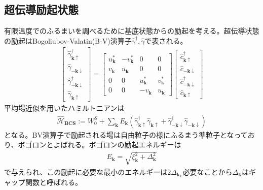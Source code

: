\documentclass[dvipdfmx, 11pt, twocolumn]{jsarticle}
\begin{document}
\subsection{超伝導励起状態}
    有限温度でのふるまいを調べるために基底状態からの励起を考える。超伝導状態の励起はBogoliubov-Valatin(B-V)演算子$\hat{\gamma}^\dagger,\hat{\gamma}$で表される。
    \begin{align}
        \left[ 
        \begin{matrix}
            \hat{\gamma}^\dagger_{\bm{k}\uparrow}\\
            \hat{\gamma}_{-\bm{k}\downarrow} \\
            \hat{\gamma}^\dagger_{-\bm{k}\downarrow}\\
            \hat{\gamma}_{\bm{k}\uparrow}
        \end{matrix}
        \right] =
        \left[
        \begin{matrix}
            u_{\bm{k}}^*&-v_{\bm{k}}^*&0&0\\
            v_{\bm{k}}&u_{\bm{k}}&0&0\\
            0&0&u_{\bm{k}}^*&v_{\bm{k}}^*\\
            0&0&-v_{\bm{k}}&u_{\bm{k}}
        \end{matrix}
        \right]
        \left[
            \begin{matrix}
                \hat{c}^\dagger_{\bm{k}\uparrow}\\
                \hat{c}_{-\bm{k}\downarrow} \\
                \hat{c}^\dagger_{-\bm{k}\downarrow}\\
                \hat{c}_{\bm{k}\uparrow}
            \end{matrix}
        \right]
    \end{align}
    平均場近似を用いたハミルトニアンは
    \begin{align}
        \hat{\mathcal{H}}_{\textbf{BCS}} := W_0^S + \sum_{\bm{k}} E_{\bm{k}}(\hat{\gamma}^\dagger_{\bm{k}\uparrow} \hat{\gamma}_{\bm{k}\uparrow} + \hat{\gamma}^\dagger_{-\bm{k}\downarrow} \hat{\gamma}_{-\bm{k}\downarrow} ) 
    \end{align}
    となる。BV演算子で励起される場は自由粒子の様にふるまう準粒子となっており、ボゴロンとよばれる。ボゴロンの励起エネルギーは
    \begin{align}
        E_{\bm{k}} = \sqrt{\xi_{\bm{k}}^2 + \Delta_{\bm{k}}^2}
    \end{align}
    で与えられ、この励起に必要な最小のエネルギーは$2\Delta_{\bm{k}_F}$必要なことから$\Delta_{\bm{k}}$はギャップ関数と呼ばれる。
\end{document}

